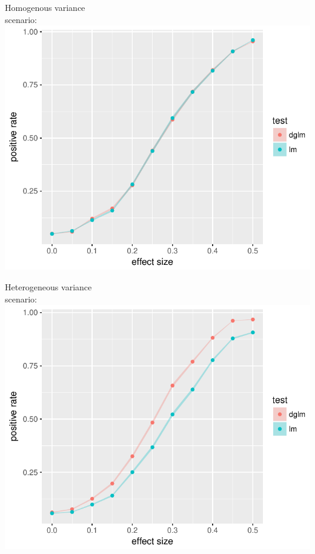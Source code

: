 \documentclass{beamer}
\begin{document}
\begin{frame}
    \begin{minipage}{0.45\textwidth}
        \begin{center}
            Homogenous variance\\scenario:
            \includegraphics[width = \textwidth]{hom_power}
        \end{center}
    \end{minipage}\hfill
    \begin{minipage}{0.45\textwidth}
        \begin{center}
            Heterogeneous variance\\scenario:
            \includegraphics[width = \textwidth]{het_power}
        \end{center}
    \end{minipage}
    

\end{frame}
\end{document}
